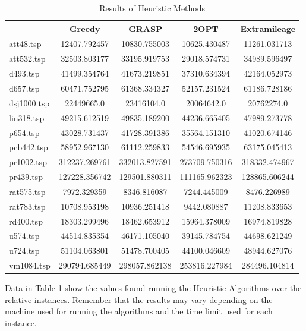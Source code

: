 \begin{table}[!h]
    \centering
    \begin{tabular}{lcccc}
    \cline{2-5}
                & \textbf{Greedy} & \textbf{GRASP}  & \textbf{2OPT}   & \textbf{Extramileage} \\ \hline
    att48.tsp   & 12407.792457    & 10830.755003    & 10625.430487    & 11261.031713          \\
    att532.tsp  & 32503.803177    & 33195.919753    & 29018.574731    & 34989.596497          \\
    d493.tsp    & 41499.354764    & 41673.219851    & 37310.634394    & 42164.052973          \\
    d657.tsp    & 60471.752795    & 61368.334327    & 52157.231524    & 61186.728186          \\
    dsj1000.tsp & 22449665.0 & 23416104.0 & 20064642.0 & 20762274.0       \\
    lin318.tsp  & 49215.612519    & 49835.189200    & 44236.665405    & 47989.273778          \\
    p654.tsp    & 43028.731437    & 41728.391386    & 35564.151310    & 41020.674146          \\
    pcb442.tsp  & 58952.967130    & 61112.259833    & 54546.695935    & 63175.045413          \\
    pr1002.tsp  & 312237.269761   & 332013.827591   & 273709.750316   & 318332.474967         \\
    pr439.tsp   & 127228.356742   & 129501.880311   & 111165.962323   & 128865.606244         \\
    rat575.tsp  & 7972.329359     & 8346.816087     & 7244.445009     & 8476.226989           \\
    rat783.tsp  & 10708.953198    & 10936.251418    & 9442.080887     & 11208.833653          \\
    rd400.tsp   & 18303.299496    & 18462.653912    & 15964.378009    & 16974.819828          \\
    u574.tsp    & 44514.835354    & 46171.105040    & 39145.784754    & 44698.621249          \\
    u724.tsp    & 51104.063801    & 51478.700405    & 44100.046609    & 48944.627076          \\
    vm1084.tsp  & 290794.685449   & 298057.862138   & 253816.227984   & 284496.104814         \\ \hline
    \end{tabular}
    \caption{Results of Heuristic Methods}
    \label{table:heuristics}
\end{table}

Data in Table \ref{table:heuristics} show the values found running the Heuristic Algorithms over the relative instances. Remember that the results may vary depending on the machine used for running the algorithms and the time limit used for each instance.



